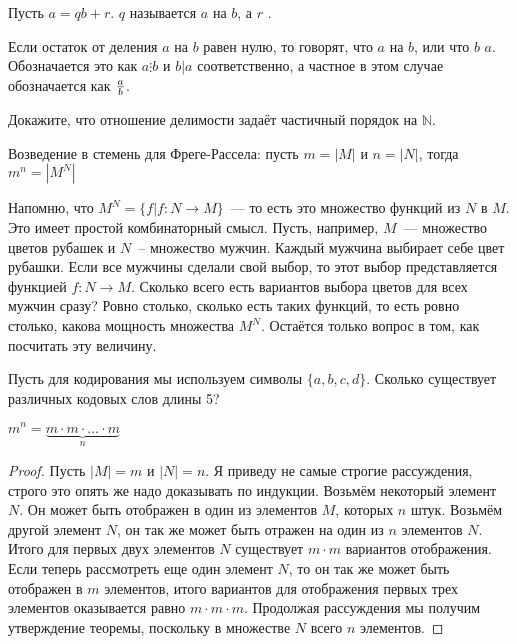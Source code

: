 \begin{definition}
Пусть $a = qb + r$. $q$ называется  $a$ на $b$, а $r$ .
\end{definition}

\begin{definition}
Если остаток от деления $a$ на $b$ равен нулю, то говорят, что $a$  на $b$, или что $b$  $a$. Обозначается это как $a\vdots b$ и  $b|a$ соответственно, а частное в этом случае обозначается как $a\over b$.
\end{definition}

\begin{exercise}
Докажите, что отношение делимости задаёт частичный порядок на $\mathbb{N}$.
\end{exercise}

\begin{definition}
Возведение в стемень для Фреге-Рассела: пусть $m = |M|$ и $n = |N|$, тогда $m^n = |M^N|$
\end{definition}

Напомню, что $M^N = \{f|f:N\to M\}$~--- то есть это множество функций из $N$ в $M$. Это имеет простой комбинаторный смысл. Пусть, например, $M$~--- множество цветов рубашек и $N$~-- множество мужчин. Каждый мужчина выбирает себе цвет рубашки. Если все мужчины сделали свой выбор, то этот выбор представляется функцией $f: N \to M$. Сколько всего есть вариантов выбора цветов для всех мужчин сразу? Ровно столько, сколько есть таких функций, то есть ровно столько, какова мощность множества $M^N$. Остаётся только вопрос в том, как посчитать эту величину.

\begin{exercise}
Пусть для кодирования мы используем символы $\{a, b, c, d\}$. Сколько существует различных кодовых слов длины 5?
\end{exercise}

\begin{thm}
$m^n = \underbrace{m\cdot m \cdot \ldots \cdot m}_n$
\end{thm}
\begin{proof}
Пусть $|M| = m$ и $|N| = n$. Я приведу не самые строгие рассуждения, строго это опять же надо доказывать по индукции. Возьмём некоторый элемент $N$. Он может быть отображен в один из элементов $M$, которых $n$ штук. Возьмём другой элемент $N$, он так же может быть отражен на один из $n$ элементов $N$. Итого для первых двух элементов $N$ существует $m\cdot m$ вариантов отображения. Если теперь рассмотреть еще один элемент $N$, то он так же может быть отображен в $m$ элементов, итого вариантов для отображения первых трех элементов оказывается равно $m\cdot m\cdot m$. Продолжая рассуждения мы получим утверждение теоремы, поскольку в множестве $N$ всего $n$ элементов.
\end{proof}

